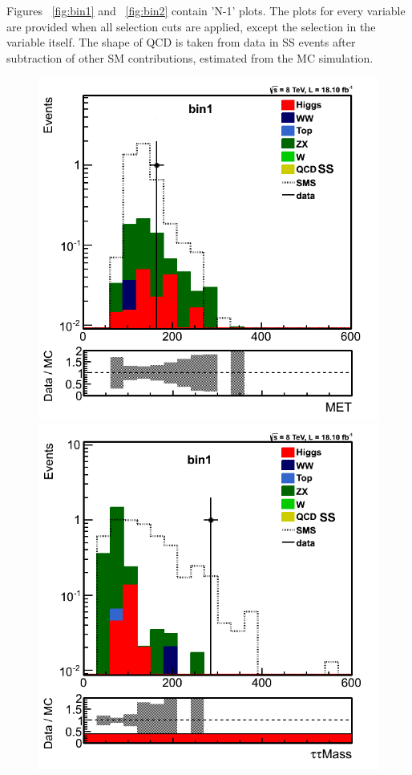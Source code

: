 Figures ~\ref{fig:bin1} and ~\ref{fig:bin2} contain 'N-1' plots. The plots for every variable are provided when all selection cuts are applied, except the selection in the variable itself.
The shape of QCD is taken from data in SS events after subtraction of other SM contributions, estimated from the MC simulation.

\begin{figure}[!Hhtb]
\centering
\includegraphics[angle=0,scale=0.35]{TauTauFigs/met_bin1_14nov.png}
\includegraphics[angle=0,scale=0.35]{TauTauFigs/zveto_bin1_14nov.png}

\end{figure}
